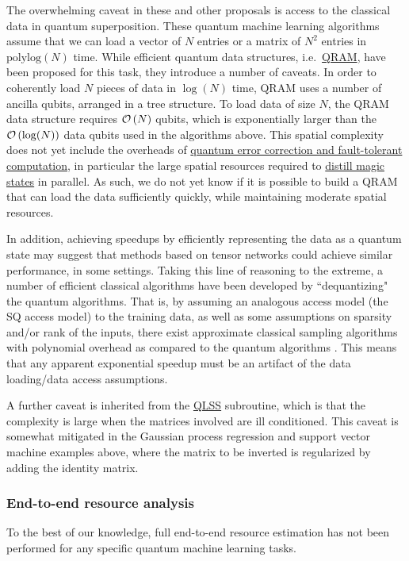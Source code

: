 \begin{refsection}
The overwhelming caveat in these and other proposals is access to the classical data in quantum superposition. These quantum machine learning algorithms assume that we can load a vector of $N$ entries or a matrix of $N^2$ entries in $\mathrm{polylog}(N)$ time. While efficient quantum data structures, i.e.~\hyperref[prim:QRAM]{QRAM}, have been proposed for this task, they introduce a number of caveats. In order to coherently load $N$ pieces of data in $\log(N)$ time, QRAM uses a number of ancilla qubits, arranged in a tree structure. To load data of size $N$, the QRAM data structure requires $\mathcal{O}\left( N \right)$ qubits, which is exponentially larger than the $\mathcal{O}\left( \log(N) \right)$ data qubits used in the algorithms above. This spatial complexity does not yet include the overheads of \hyperref[prim:FTQC]{quantum error correction and fault-tolerant computation}, in particular the large spatial resources required to \hyperref[prim:LatticeSurgery]{distill magic states} in parallel. As such, we do not yet know if it is possible to build a QRAM that can load the data sufficiently quickly, while maintaining moderate spatial resources.

In addition, achieving speedups by efficiently representing the data as a quantum state may suggest that methods based on tensor networks could achieve similar performance, in some settings.
Taking this line of reasoning to the extreme, a number of efficient classical algorithms have been developed by ``dequantizing" the quantum algorithms. That is, by assuming an analogous access model (the SQ access model) to the training data, as well as some assumptions on sparsity and/or rank of the inputs, there exist approximate classical sampling algorithms with polynomial overhead as compared to the quantum algorithms \cite{tang2018QInspiredClassAlgPCA,tang2018QuantumInspiredRecommSys}. This means that any apparent exponential speedup must be an artifact of the data loading/data access assumptions. 


A further caveat is inherited from the \hyperref[prim:QuantumLinearSystemSolvers]{QLSS} subroutine, which is that the complexity is large when the matrices involved are ill conditioned. This caveat is somewhat mitigated in the Gaussian process regression and support vector machine examples above, where the matrix to be inverted is regularized by adding the identity matrix.

\subsubsection*{End-to-end resource analysis}
To the best of our knowledge, full end-to-end resource estimation has not been performed for any specific quantum machine learning tasks. 


\end{refsection}
